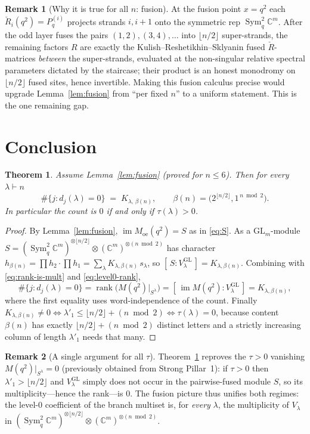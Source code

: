 \documentclass[11pt]{article}
\newtheorem{theorem}{Theorem}
\theoremstyle{definition}
\newtheorem{remark}{Remark}
\newcommand{\Sym}{\operatorname{Sym}}
\newcommand{\im}{\operatorname{im}}
\newcommand{\rank}{\operatorname{rank}}
\newcommand{\GL}{\mathrm{GL}}
\newcommand{\C}{\mathbb{C}}
\newcommand{\la}{\lambda}
\newcommand{\Rh}{\check{R}}
\begin{document}
\begin{remark}[Why it is true for all $n$: fusion]
At the fusion point $x=q^2$ each $\Rh_i(q^2)=P_q^{(i)}$ projects strands $i,i+1$
onto the symmetric rep $\Sym^2_q\C^m$.  After the odd layer fuses the pairs
$(1,2),(3,4),\dots$ into $\lfloor n/2\rfloor$ super-strands, the remaining
factors $R$ are exactly the Kulish--Reshetikhin--Sklyanin fused $\Rh$-matrices
\emph{between} the super-strands, evaluated at the non-singular relative spectral
parameters dictated by the staircase; their product is an honest monodromy on
$\lfloor n/2\rfloor$ fused sites, hence invertible.  Making this fusion calculus
precise would upgrade Lemma~\ref{lem:fusion} from ``per fixed $n$'' to a uniform
statement.  This is the one remaining gap.
\end{remark}

\section{Conclusion}

\begin{theorem}\label{thm:main}
Assume Lemma~\ref{lem:fusion} (proved for $n\le 6$).  Then for every $\la\vdash n$
\[
   \#\{j:d_j(\la)=0\}\;=\;K_{\la,\,\beta(n)},
   \qquad \beta(n)=\bigl(2^{\lfloor n/2\rfloor},1^{\,n\bmod 2}\bigr).
\]
In particular the count is $0$ if and only if $\tau(\la)>0$.
\end{theorem}

\begin{proof}
By Lemma~\ref{lem:fusion}, $\im M_{\mathrm{oe}}(q^2)=S$ as in \eqref{eq:S}.  As a
$\GL_m$-module $S=(\Sym^2_q\C^m)^{\otimes\lfloor n/2\rfloor}
\otimes(\C^m)^{\otimes(n\bmod 2)}$ has character
$h_{\beta(n)}=\prod h_2\cdot\prod h_1=\sum_\la K_{\la,\beta(n)}\,s_\la$, so
$[\,S:V_\la^{\GL}\,]=K_{\la,\beta(n)}$.  Combining with
\eqref{eq:rank-is-mult} and \eqref{eq:level0-rank},
\[
   \#\{j:d_j(\la)=0\}=\rank\bigl(M(q^2)|_{S^\la}\bigr)
      =[\,\im M(q^2):V_\la^{\GL}\,]=K_{\la,\beta(n)} ,
\]
where the first equality uses word-independence of the count.  Finally
$K_{\la,\beta(n)}\neq0\iff\la'_1\le\lfloor n/2\rfloor+ (n\bmod 2)\iff\tau(\la)=0$,
because content $\beta(n)$ has exactly $\lfloor n/2\rfloor+(n\bmod2)$ distinct
letters and a strictly increasing column of length $\la'_1$ needs that many.
\end{proof}

\begin{remark}[A single argument for all $\tau$]
Theorem~\ref{thm:main} reproves the $\tau>0$ vanishing
$M(q^2)|_{S^\la}=0$ (previously obtained from Strong Pillar~1): if $\tau>0$ then
$\la'_1>\lfloor n/2\rfloor$ and $V_\la^{\GL}$ simply does not occur in the
pairwise-fused module $S$, so its multiplicity---hence the rank---is $0$.  The
fusion picture thus unifies both regimes: the level-$0$ coefficient of the
branch multiset is, for \emph{every} $\la$, the multiplicity of $V_\la$ in
$(\Sym^2_q\C^m)^{\otimes\lfloor n/2\rfloor}\otimes(\C^m)^{\otimes(n\bmod2)}$.
\end{remark}
\end{document}
